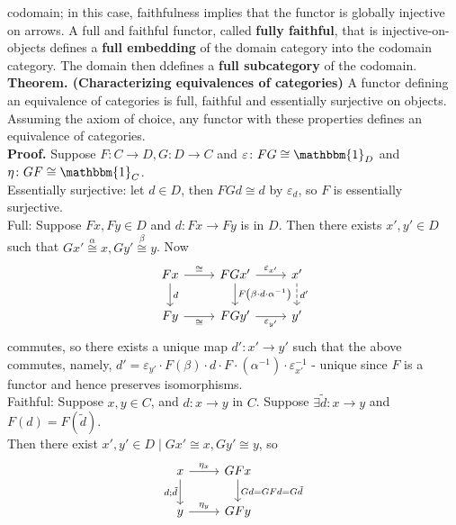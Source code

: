 \documentclass[a4paper]{article}
\theoremstyle{plain}%
\theoremstyle{definition}
\theoremstyle{remark}
\begin{document}
codomain; in this case, faithfulness implies that the functor is globally
injective on arrows. A full and faithful functor, called \textbf{fully
faithful}, that is injective-on-objects defines a \textbf{full embedding} of
the domain category into the codomain category. The domain then ddefines
a \textbf{full subcategory} of the codomain.\\
\linebreak
\textbf{Theorem. (Characterizing equivalences of categories)} A functor
defining an equivalence of categories is full, faithful and essentially
surjective on objects. Assuming the axiom of choice, any functor with these
properties defines an equivalence of categories.\\
\linebreak
\textbf{Proof.} 
Suppose $F  \colon C \to D, G  \colon D \to C$ and
$\varepsilon  \colon FG \cong \mathbbm{1}_{D}$ and
$ \eta  \colon GF \cong \mathbbm{1}_C$.\\
\linebreak
Essentially surjective: let $d \in D$, then
$FG d \cong d$ by $\varepsilon_{d}$, so $F$ is essentially surjective.\\
\linebreak
Full: Suppose $Fx, Fy \in D$ and
$d  \colon Fx \to Fy$ is in $D$. Then there exists $x', y' \in D$ such that
$Gx' \stackrel{\alpha}{\cong}x, Gy' \stackrel{\beta}{\cong} y$. Now
\begin{equation*}
\begin{tikzcd}
    Fx \ar[r, "\cong"] \ar[d, "d"] & FGx' \ar[r, "\varepsilon_{x'}"] \ar[d, "F
    \left( \beta \cdot d \cdot \alpha^{-1} \right) "] & x' \ar[d, dashed, "d'"] \\
    Fy \ar[r, "\cong"'] & FGy' \ar[r, "\varepsilon_{y'}"'] & y'
\end{tikzcd}
\end{equation*}
commutes, so there exists a unique map $d'  \colon x' \to y'$ such that the
above commutes, namely, $d' = \varepsilon_{y'} \cdot F(\beta) \cdot d \cdot 
F \cdot  \left( \alpha^{-1} \right) \cdot \varepsilon_{x'}^{-1} $ - unique since $F$
is a functor and hence preserves isomorphisms.\\
\linebreak
Faithful: Suppose $x,y \in C$, and $d  \colon x \to y$ in $C$. Suppose 
$\exists  \tilde{d}  \colon x \to y$ and
$F(d) = F(\tilde{d})$.\\
Then there exist $x', y' \in D  \mid Gx' \cong x, Gy' \cong y$, so
\begin{equation*}
\begin{tikzcd}
    x \ar[d, "d; \tilde{d}"'] \ar[r, "\eta_{x}"] & GF x \ar[d, " Gd = GF d = G\tilde{d}"]\\
    y \ar[r, "\eta_{y}"] & GFy
\end{tikzcd}
\end{equation*}
\end{document}
